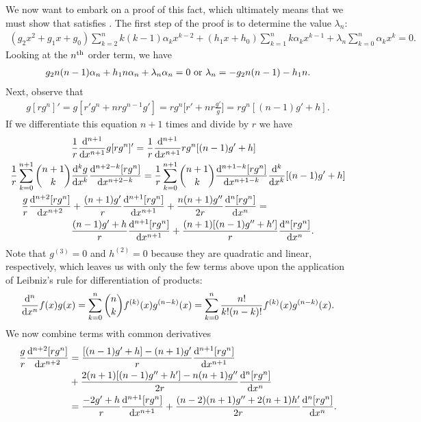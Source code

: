 We now want to embark on a proof of this fact, which ultimately means that we must show that  satisfies .
The first step of the proof is to determine the value $\lambda_{n}$:
\begin{align}
    (g_2x^2 + g_1x + g_0) \sum_{k=2}^{n} k(k-1) \alpha_{k} x^{k-2} + (h_1 x + h_0) \sum_{k=1}^{n} k \alpha_{k} x^{k-1} + \lambda_{n} \sum_{k=0}^{n} \alpha_{k} x^{k} = 0
.\end{align}
Looking at the $n^{\rm th}$ order term, we have
\begin{eqnarray}
    g_2 n(n-1) \alpha_{n} + h_1 n \alpha_{n} + \lambda_{n} \alpha_{n} = 0 ~{\rm or}~ \lambda_{n} = -g_2 n(n-1) - h_1 n
.\end{eqnarray}
Next, observe that
\begin{eqnarray}
    g[r g^{n}]' = g [ r' g^{n} + n r g^{n-1} g' ] = r g^{n} \Big[ r' + n r \frac{g'}{g} \Big] = r g^{n} [ (n-1)g' + h ]
.\end{eqnarray}
If we differentiate this equation $n + 1$ times and divide by $r$ we have
\begin{align}
    &\frac{1}{r} \dv[n+1]{x} g [ rg^{n} ]' = \frac{1}{r} \dv[n+1]{x} rg^{n} [ (n-1)g' + h ] \nonumber \\
    \frac{1}{r} \sum_{k=0}^{n+1} \binom{n+1}{k} &\dv[k]{g}{x} \dv[n+2-k]{[rg^{n}]}{x} = \frac{1}{r} \sum_{k=0}^{n+1} \binom{n+1}{k} \dv[n+1-k]{[rg^{n}]}{x} \dv[k]{x} [ (n-1)g' + h ] \nonumber \\
    \frac{g}{r} \dv[n+2]{[rg^{n}]}{x} &+ \frac{(n+1)g'}{r} \dv[n+1]{[rg^{n}]}{x} + \frac{n(n+1) g''}{2r} \dv[n]{[rg^{n}]}{x} = \nonumber \\
    &\frac{(n-1)g' + h}{r} \dv[n+1]{[rg^{n}]}{x} + \frac{(n+1)[ (n-1)g'' + h' ]}{r} \dv[n]{[rg^{n}]}{x} \nonumber
.\end{align}
Note that $g^{(3)} = 0$ and $h^{(2)} = 0$ because they are quadratic and linear, respectively, which leaves us with only the few terms above upon the application of Leibniz's rule for differentiation of products:
\begin{align}
    \dv[n]{x} f(x) g(x) = \sum_{k=0}^{n} \binom{n}{k} f^{(k)}(x) g^{(n-k)}(x) = \sum_{k=0}^{n} \frac{n!}{k!(n-k)!} f^{(k)}(x) g^{(n-k)}(x)
.\end{align}
We now combine terms with common derivatives 
\begin{align}
    \frac{g}{r} \dv[n+2]{[rg^{n}]}{x} &= \frac{[(n-1)g' + h] - (n+1)g'}{r} \dv[n+1]{[rg^{n}]}{x} \nonumber \\
    &+ \frac{2(n+1)[(n-1)g'' + h'] - n(n+1)g''}{2r} \dv[n]{[rg^{n}]}{x} \nonumber \\
    &= \frac{-2g' + h}{r} \dv[n+1]{[rg^{n}]}{x} + \frac{(n-2)(n+1)g'' + 2(n+1)h'}{2r} \dv[n]{[rg^{n}]}{x}
.\end{align}
